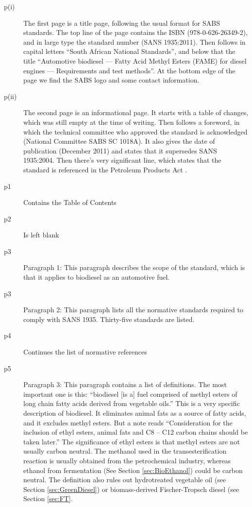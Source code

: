 \begin{description}


\item[p(i)]{The first page is a title page, following the usual format for SABS
standards. The top line of the page contains the ISBN (978-0-626-26349-2), and
in large type the standard number (SANS 1935:2011). Then follows in capital
letters ``South African National Standards'', and below that the title
``Automotive biodiesel --- Fatty Acid Methyl Esters (FAME) for diesel engines
--- Requirements and test methods''. At the bottom edge of the page we find the
SABS logo and some contact information.}

\item[p(ii)]{The second page is an informational page. It starts with a table of
changes, which was still empty at the time of writing. Then follows a foreword,
in which the technical committee who approved the standard is acknowledged
(National Committee SABS SC 1018A). It also gives the date of publication
(December 2011) and states that it supersedes SANS 1935:2004. Then there's very
significant line, which states that the standard is referenced in the Petroleum
Products Act \autocite{Act120-1997}. }
	
\item[p1]{Contains the Table of Contents} 

\item[p2]{Is left blank}

\item[p3]{Paragraph 1: This paragraph describes the scope of the standard, which
is that it applies to biodiesel as an automotive fuel.} 

\item[p3]{Paragraph 2:
This paragraph lists all the normative standards required to comply with SANS
1935. Thirty-five standards are listed.}

\item[p4]{Continues the list of normative references}

\item[p5]{Paragraph 3: This paragraph contains a list of definitions. The most
important one is this: ``biodiesel [is a] fuel comprised of methyl esters of
long chain fatty acids derived from vegetable oils.'' This is a very specific
description of biodiesel. It eliminates animal fats as a source of fatty acids,
and it excludes methyl esters. But a note reads ``Consideration for the
inclusion of ethyl esters, animal fats and C8 – C12 carbon chains should be
taken later.'' The significance of ethyl esters is that methyl esters are not
usually carbon neutral. The methanol used in the transesterification reaction is
usually obtained from the petrochemical industry, whereas ethanol from
fermentation (See Section \ref{sec:BioEthanol}) could be carbon neutral. The
definition also rules out hydrotreated vegetable oil (see Section
\ref{sec:GreenDiesel}) or biomass-derived Fischer-Tropsch diesel (see Section
\ref{sec:FT}.}


\end{description}
